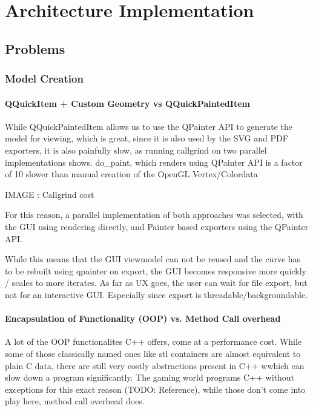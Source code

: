 \chapter{Architecture Implementation}

\section{Problems}
\subsection{Model Creation}

\subsubsection{QQuickItem + Custom Geometry vs QQuickPaintedItem}
While QQuickPaintedItem allows us to use the QPainter API to generate the model for viewing, which is great, since it is also used by the SVG and PDF exporters, it is also painfully slow, as running callgrind on two parallel implementations shows.
do\_paint, which renders using QPainter API is a factor of 10 slower than manual creation of the OpenGL Vertex/Colordata

IMAGE : Callgrind cost

For this reason, a parallel implementation of both approaches was selected, with the GUI using rendering directly, and Painter based exporters using the QPainter API.

While this means that the GUI viewmodel can not be reused and the curve has to be rebuilt using qpainter on export, the GUI becomes responsive more quickly / scales to more iterates. As far as UX goes, the user can wait for file export, but not for an interactive GUI.
Especially since export is threadable/backgroundable.

\subsubsection{Encapsulation of Functionality (OOP) vs. Method Call overhead}
A lot of the OOP functionalites C++ offers, come at a performance cost.
While some of those classically named ones like stl containers are almost equivalent to plain C data, there are still very costly abstractions present in C++ wwhich can slow down a program significantly.
The gaming world programs C++ without exceptions for this exact reason (TODO: Reference), while those don't come into play here, method call overhead does.


